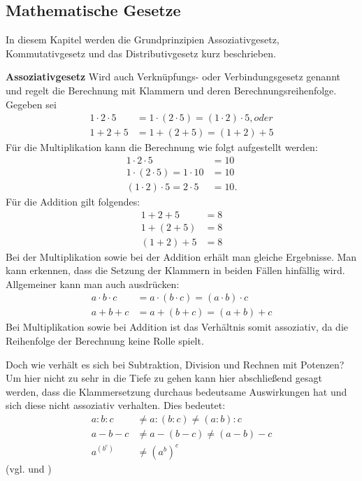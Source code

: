 \documentclass[12pt,a4paper]{article}
\theoremstyle{definition}
\begin{document}
\subsection{Mathematische Gesetze}
In diesem Kapitel werden die Grundprinzipien Assoziativgesetz, Kommutativgesetz und das Distributivgesetz kurz beschrieben.

\textbf{Assoziativgesetz}\newline
Wird auch Verknüpfungs- oder Verbindungsgesetz genannt und regelt die Berechnung mit Klammern und deren Berechnungsreihenfolge.
Gegeben sei
\begin{align}
1 \cdot 2 \cdot 5 &= 1 \cdot (2 \cdot 5) = (1 \cdot 2) \cdot 5, oder \\
1 + 2 + 5         &= 1 +(2 + 5)          = (1 + 2) + 5
\end{align}
Für die Multiplikation kann die Berechnung wie folgt aufgestellt werden:
\begin{align}
1 \cdot 2 \cdot 5                &= 10 \\
1 \cdot (2 \cdot 5) = 1 \cdot 10 &= 10 \\
(1 \cdot 2) \cdot 5 = 2 \cdot 5  &= 10.
\end{align}
Für die Addition gilt folgendes:
\begin{align}
1 + 2 + 5   &= 8 \\
1 + (2 + 5) &= 8 \\
(1 + 2) + 5 &= 8
\end{align}
Bei der Multiplikation sowie bei der Addition erhält man gleiche Ergebnisse.
Man kann erkennen, dass die Setzung der Klammern in beiden Fällen hinfällig wird.
Allgemeiner kann man auch ausdrücken:
\begin{align}
a \cdot b \cdot c &= a \cdot (b \cdot c) = (a \cdot b) \cdot c \\
a + b + c         &= a + (b + c) = (a + b) + c
\end{align}
Bei Multiplikation sowie bei Addition ist das Verhältnis somit assoziativ, da die Reihenfolge der Berechnung keine Rolle spielt.

Doch wie verhält es sich bei Subtraktion, Division und Rechnen mit Potenzen?
Um hier nicht zu sehr in die Tiefe zu gehen kann hier abschließend gesagt werden, dass die Klammersetzung durchaus bedeutsame Auswirkungen hat und sich diese nicht assoziativ verhalten.
Dies bedeutet:
\begin{align}
a : b : c &\neq a : ( b : c) \neq (a : b) : c \\
a - b - c &\neq a - ( b - c) \neq (a - b) - c \\
a^{(b^c)} &\neq (a^b)^c
\end{align}
(vgl. \cite[5--7]{Adler2013} und \cite{AssociativityEncyclopediaofMathematics2016})
\end{document}
